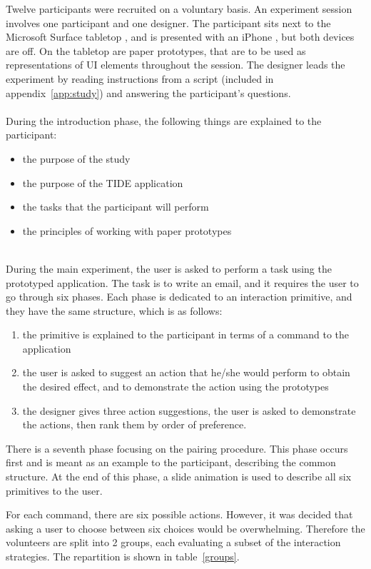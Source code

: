 Twelve participants were recruited on a voluntary basis.
An experiment session involves one participant and one designer.
The participant sits next to the Microsoft Surface tabletop \citep{ms}, and is presented with an iPhone \citep{iphone}, but both devices are off.
On the tabletop are paper prototypes, that are to be used as representations of UI elements throughout the session.
The designer leads the experiment by reading instructions from a script (included in appendix~\ref{app:study}) and answering the participant's questions.
\hfill\\\\
During the introduction phase, the following things are explained to the participant:
\begin{itemize}
\item the purpose of the study
\item the purpose of the TIDE application
\item the tasks that the participant will perform
\item the principles of working with paper prototypes
\end{itemize}
\hfill\\
During the main experiment, the user is asked to perform a task using the prototyped application.
The task is to write an email, and it requires the user to go through six phases.
Each phase is dedicated to an interaction primitive, and they have the same structure, which is as follows:
\begin{enumerate}
\item the primitive is explained to the participant in terms of a command to the application
\item the user is asked to suggest an action that he/she would perform to obtain the desired effect, and to demonstrate the action using the prototypes
\item the designer gives three action suggestions, the user is asked to demonstrate the actions, then rank them by order of preference.
\end{enumerate}

There is a seventh phase focusing on the pairing procedure.
This phase occurs first and is meant as an example to the participant, describing the common structure.
At the end of this phase, a slide animation is used to describe all six primitives to the user.

For each command, there are six possible actions.
However, it was decided that asking a user to choose between six choices would be overwhelming.
Therefore the volunteers are split into 2 groups, each evaluating a subset of the interaction strategies.
The repartition is shown in table~\ref{groups}.

